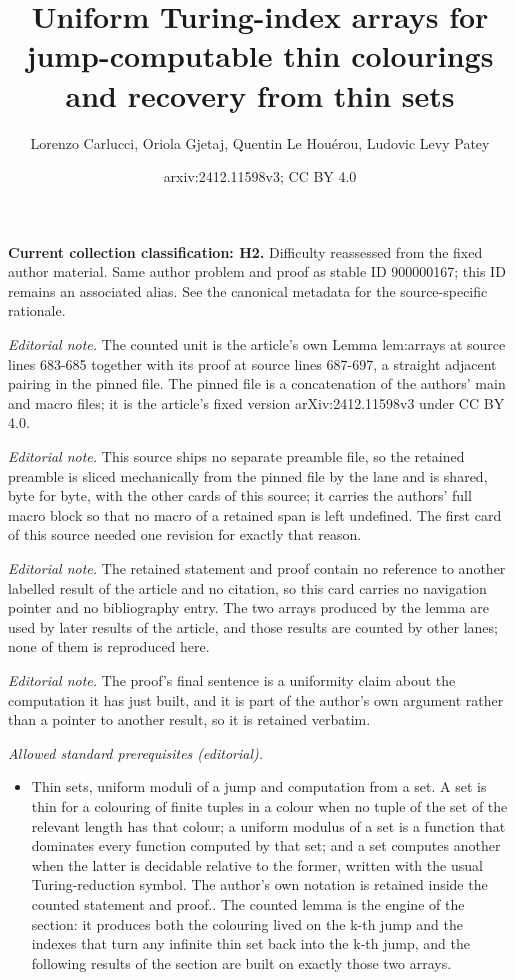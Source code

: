 \documentclass{article}
\title{Uniform Turing-index arrays for jump-computable thin colourings and recovery from thin sets}
\author{Lorenzo Carlucci, Oriola Gjetaj, Quentin Le Houérou, Ludovic Levy Patey}
\date{arxiv:2412.11598v3; CC BY 4.0}
\numberwithin{theorem}{section}
\begin{document}
\maketitle
\par\medskip\noindent\textbf{Current collection classification: H2.} Difficulty reassessed from the fixed author material. Same author problem and proof as stable ID 900000167; this ID remains an associated alias. See the canonical metadata for the source-specific rationale.\par\medskip

\noindent\textit{Editorial note.} The counted unit is the article's own Lemma lem:arrays at source lines 683-685 together with its proof at source lines 687-697, a straight adjacent pairing in the pinned file. The pinned file is a concatenation of the authors' main and macro files; it is the article's fixed version arXiv:2412.11598v3 under CC BY 4.0.\par\medskip
\noindent\textit{Editorial note.} This source ships no separate preamble file, so the retained preamble is sliced mechanically from the pinned file by the lane and is shared, byte for byte, with the other cards of this source; it carries the authors' full macro block so that no macro of a retained span is left undefined. The first card of this source needed one revision for exactly that reason.\par\medskip
\noindent\textit{Editorial note.} The retained statement and proof contain no reference to another labelled result of the article and no citation, so this card carries no navigation pointer and no bibliography entry. The two arrays produced by the lemma are used by later results of the article, and those results are counted by other lanes; none of them is reproduced here.\par\medskip
\noindent\textit{Editorial note.} The proof's final sentence is a uniformity claim about the computation it has just built, and it is part of the author's own argument rather than a pointer to another result, so it is retained verbatim.\par\medskip
\noindent\textit{Allowed standard prerequisites (editorial).}\begin{itemize}
\item Thin sets, uniform moduli of a jump and computation from a set. A set is thin for a colouring of finite tuples in a colour when no tuple of the set of the relevant length has that colour; a uniform modulus of a set is a function that dominates every function computed by that set; and a set computes another when the latter is decidable relative to the former, written with the usual Turing-reduction symbol. The author's own notation is retained inside the counted statement and proof.. The counted lemma is the engine of the section: it produces both the colouring lived on the k-th jump and the indexes that turn any infinite thin set back into the k-th jump, and the following results of the section are built on exactly those two arrays.
\end{itemize}\medskip
\end{document}
